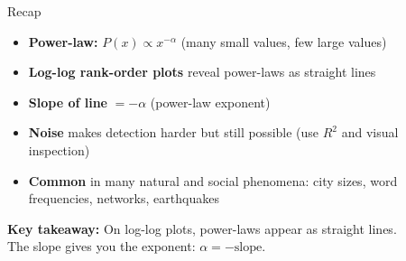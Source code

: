 \documentclass[aspectratio=169]{beamer}
\begin{document}
\begin{frame}{Recap}
  \small
  \begin{itemize}
    \item \textbf{Power-law:} $P(x) \propto x^{-\alpha}$ (many small values, few large values)
    \item \textbf{Log-log rank-order plots} reveal power-laws as straight lines
    \item \textbf{Slope of line} $= -\alpha$ (power-law exponent)
    \item \textbf{Noise} makes detection harder but still possible (use $R^2$ and visual inspection)
    \item \textbf{Common} in many natural and social phenomena: city sizes, word frequencies, networks, earthquakes
  \end{itemize}
  \vspace{0.3cm}
  \begin{center}
    \textbf{Key takeaway:} On log-log plots, power-laws appear as straight lines.\\
    The slope gives you the exponent: $\alpha = -\text{slope}$.
  \end{center}
\end{frame}
\end{document}
